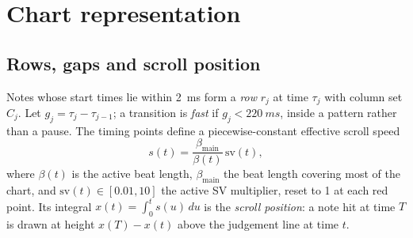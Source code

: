 \documentclass[10pt,twocolumn]{article}
\begin{document}


\section{Chart representation}\label{sec:features}

\subsection{Rows, gaps and scroll position}\label{sec:rows}
Notes whose start times lie within \SI{2}{ms} form a \emph{row} $r_j$ at time $\tau_j$ with column set $C_j$. Let $g_j=\tau_j-\tau_{j-1}$; a transition is \emph{fast} if $g_j<\SI{220}{ms}$, inside a pattern rather than a pause. The timing points define a piecewise-constant effective scroll speed
\begin{equation}
s(t)=\frac{\beta_{\text{main}}}{\beta(t)}\,\mathrm{sv}(t),
\end{equation}
where $\beta(t)$ is the active beat length, $\beta_{\text{main}}$ the beat length covering most of the chart, and $\mathrm{sv}(t)\in[0.01,10]$ the active SV multiplier, reset to 1 at each red point. Its integral $x(t)=\int_0^t s(u)\,du$ is the \emph{scroll position}: a note hit at time $T$ is drawn at height $x(T)-x(t)$ above the judgement line at time $t$.
\end{document}
